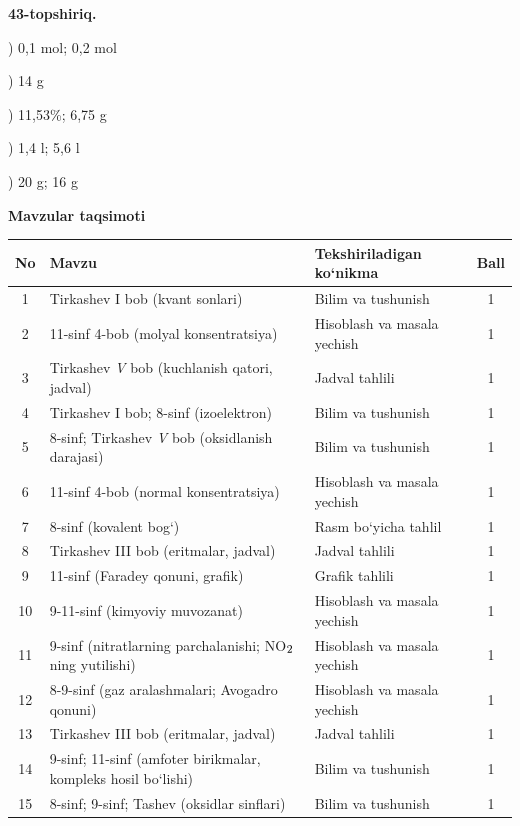\documentclass[11pt,a4paper]{article}
\renewcommand{\textsubscript}[1]{\ensuremath{_{\text{\fontsize{8}{8}\selectfont #1}}}}
\begin{document}
\noindent\textbf{43-topshiriq.}\par
{}) 0,1 mol; 0,2 mol\par
{}) 14 g\par
{}) 11,53\%; 6,75 g\par
{}) 1,4 l; 5,6 l\par
{}) 20 g; 16 g\par
\par\bigskip\noindent\textbf{Mavzular taqsimoti}\par\smallskip
{\small\noindent\begin{longtable}{|c|p{7.2cm}|p{5.4cm}|c|}\hline \textbf{No} & \textbf{Mavzu} & \textbf{Tekshiriladigan ko`nikma} & \textbf{Ball}\\\hline
1 & Tirkashev I bob (kvant sonlari) & Bilim va tushunish & 1\\\hline
2 & 11-sinf 4-bob (molyal konsentratsiya) & Hisoblash va masala yechish & 1\\\hline
3 & Tirkashev \textit{V} bob (kuchlanish qatori, jadval) & Jadval tahlili & 1\\\hline
4 & Tirkashev I bob; 8-sinf (izoelektron) & Bilim va tushunish & 1\\\hline
5 & 8-sinf; Tirkashev \textit{V} bob (oksidlanish darajasi) & Bilim va tushunish & 1\\\hline
6 & 11-sinf 4-bob (normal konsentratsiya) & Hisoblash va masala yechish & 1\\\hline
7 & 8-sinf (kovalent bog`) & Rasm bo`yicha tahlil & 1\\\hline
8 & Tirkashev III bob (eritmalar, jadval) & Jadval tahlili & 1\\\hline
9 & 11-sinf (Faradey qonuni, grafik) & Grafik tahlili & 1\\\hline
10 & 9-11-sinf (kimyoviy muvozanat) & Hisoblash va masala yechish & 1\\\hline
11 & 9-sinf (nitratlarning parchalanishi; NO\textsubscript{2} ning yutilishi) & Hisoblash va masala yechish & 1\\\hline
12 & 8-9-sinf (gaz aralashmalari; Avogadro qonuni) & Hisoblash va masala yechish & 1\\\hline
13 & Tirkashev III bob (eritmalar, jadval) & Jadval tahlili & 1\\\hline
14 & 9-sinf; 11-sinf (amfoter birikmalar, kompleks hosil bo`lishi) & Bilim va tushunish & 1\\\hline
15 & 8-sinf; 9-sinf; Tashev (oksidlar sinflari) & Bilim va tushunish & 1\\\hline

\end{longtable}}
\end{document}

